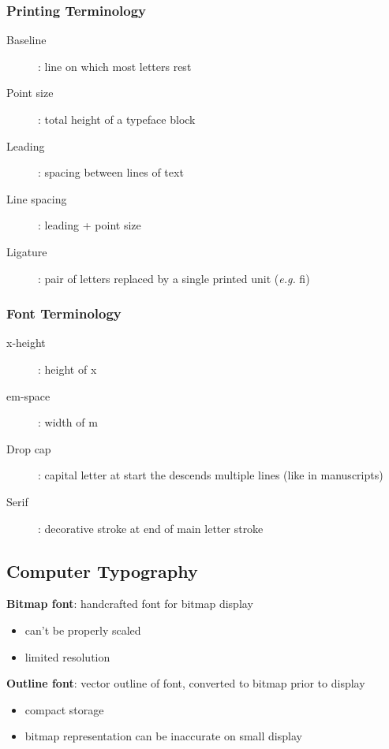 \documentclass[]{article}
\theoremstyle{definition}
\begin{document}
	\subsubsection{Printing Terminology}
	\begin{description}
		\item[Baseline]: line on which most letters rest
		\item[Point size]: total height of a typeface block
		\item[Leading]: spacing between lines of text
		\item[Line spacing]: leading + point size
		\item[Ligature]: pair of letters replaced by a single printed unit (\textit{e.g.} fi)
	\end{description}

	\subsubsection{Font Terminology}
	\begin{description}
		\item[x-height]: height of x
		\item[em-space]: width of m
		\item[Drop cap]: capital letter at start the descends multiple lines (like in manuscripts)
		\item[Serif]: decorative stroke at end of main letter stroke
	\end{description}

	\subsection{Computer Typography}
	\textbf{Bitmap font}: handcrafted font for bitmap display
	\begin{itemize}
		\item can't be properly scaled
		\item limited resolution
	\end{itemize}

	\textbf{Outline font}: vector outline of font, converted to bitmap prior to display
	\begin{itemize}
		\item compact storage
		\item bitmap representation can be inaccurate on small display
	\end{itemize}
\end{document}
